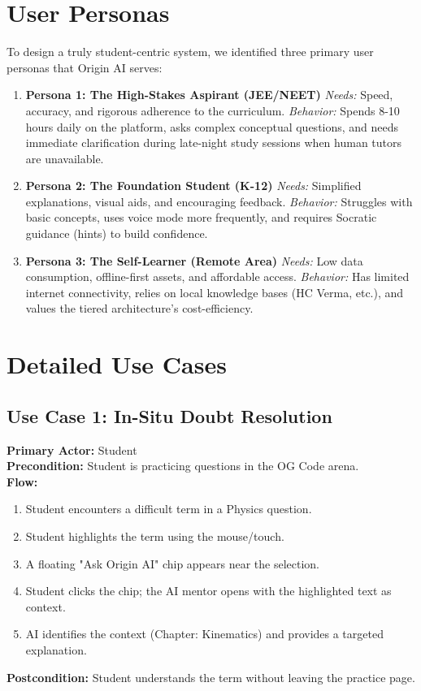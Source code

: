 \section{User Personas}

To design a truly student-centric system, we identified three primary user personas that Origin AI serves:

\begin{enumerate}
    \item \textbf{Persona 1: The High-Stakes Aspirant (JEE/NEET)}  
    \textit{Needs:} Speed, accuracy, and rigorous adherence to the curriculum.  
    \textit{Behavior:} Spends 8-10 hours daily on the platform, asks complex conceptual questions, and needs immediate clarification during late-night study sessions when human tutors are unavailable.
    \item \textbf{Persona 2: The Foundation Student (K-12)}  
    \textit{Needs:} Simplified explanations, visual aids, and encouraging feedback.  
    \textit{Behavior:} Struggles with basic concepts, uses voice mode more frequently, and requires Socratic guidance (hints) to build confidence.
    \item \textbf{Persona 3: The Self-Learner (Remote Area)}  
    \textit{Needs:} Low data consumption, offline-first assets, and affordable access.  
    \textit{Behavior:} Has limited internet connectivity, relies on local knowledge bases (HC Verma, etc.), and values the tiered architecture's cost-efficiency.
\end{enumerate}

\section{Detailed Use Cases}

\subsection{Use Case 1: In-Situ Doubt Resolution}
\textbf{Primary Actor:} Student \\
\textbf{Precondition:} Student is practicing questions in the OG Code arena. \\
\textbf{Flow:}
\begin{enumerate}
    \item Student encounters a difficult term in a Physics question.
    \item Student highlights the term using the mouse/touch.
    \item A floating "Ask Origin AI" chip appears near the selection.
    \item Student clicks the chip; the AI mentor opens with the highlighted text as context.
    \item AI identifies the context (Chapter: Kinematics) and provides a targeted explanation.
\end{enumerate}
\textbf{Postcondition:} Student understands the term without leaving the practice page.


